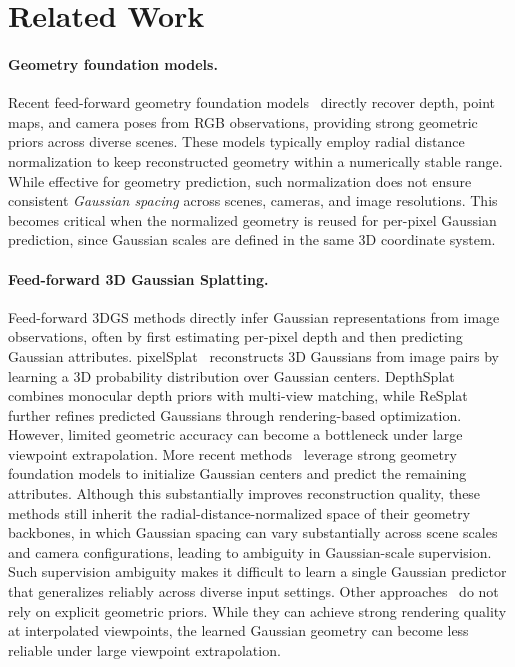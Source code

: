 \section{Related Work}
\label{sec:related-work}
\paragraph{Geometry foundation models.}
Recent feed-forward geometry foundation models~\citep{wang2024dust3r,wang2025vggt,lin2025depth,liu2025worldmirror,jiang2026omnix} directly recover depth, point maps, and camera poses from RGB observations, providing strong geometric priors across diverse scenes.
These models typically employ radial distance normalization to keep reconstructed geometry within a numerically stable range. While effective for geometry prediction, such normalization does not ensure consistent \emph{Gaussian spacing} across scenes, cameras, and image resolutions. This becomes critical when the normalized geometry is reused for per-pixel Gaussian prediction, since Gaussian scales are defined in the same 3D coordinate system.
\paragraph{Feed-forward 3D Gaussian Splatting.}
Feed-forward 3DGS methods directly infer Gaussian representations from image observations, often by first estimating per-pixel depth and then predicting Gaussian attributes. pixelSplat~\citep{charatan2024pixelsplat} reconstructs 3D Gaussians from image pairs by learning a 3D probability distribution over Gaussian centers. DepthSplat~\citep{xu2025depthsplat} combines monocular depth priors with multi-view matching, while ReSplat~\citep{xu2025resplat} further refines predicted Gaussians through rendering-based optimization. However, limited geometric accuracy can become a bottleneck under large viewpoint extrapolation.
More recent methods~\citep{jiang2025anysplat,lin2025depth,team2026hy,
anonymous2027infinisplatv2} leverage strong geometry foundation models
to initialize Gaussian centers and predict the remaining attributes.
Although this substantially improves reconstruction quality, these
methods still inherit the radial-distance-normalized space of their
geometry backbones, in which Gaussian spacing can vary substantially
across scene scales and camera configurations, leading to ambiguity in
Gaussian-scale supervision. Such supervision ambiguity makes it difficult
to learn a single Gaussian predictor that generalizes reliably across
diverse input settings.
Other approaches~\citep{an2025c3g,li2026querysplat} do not rely on
explicit geometric priors. While they can achieve strong rendering
quality at interpolated viewpoints, the learned Gaussian geometry can
become less reliable under large viewpoint extrapolation.
